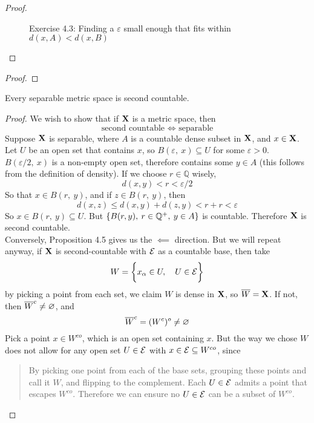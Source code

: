 \documentclass[../../main.tex]{subfiles}
\begin{document}
\begin{proof}
\begin{figure}
    \caption{Exercise 4.3: Finding a $\varepsilon$ small enough that fits within $d(x,A) < d(x,B)$}
    \label{fig:ex4.3}
\end{figure}
\end{proof}
\newpage

\begin{wts}
    
\end{wts}
\begin{proof}
    
\end{proof}
\newpage


\begin{wts}
    Every separable metric space is second countable.
\end{wts}
\begin{proof}
    We wish to show that if ${\mathbf{X}}$ is a metric space, then
    \[
        \text{second countable } \iff \text{ separable}
    \]
    Suppose ${\mathbf{X}}$ is separable, where $A$ is a countable dense subset in ${\mathbf{X}}$, and $x\in{\mathbf{X}}$. Let $U$ be an open set that contains $x$, so $B(\varepsilon,\: x)\subseteq U$ for some $\varepsilon>0$. $B(\varepsilon/2,\: x)$ is a non-empty open set, therefore contains some $y\in A$ (this follows from the definition of density). If we choose $r\in \mathbb{Q}$ wisely,
    \[
        d(x,y) < r < \varepsilon/2
    \]
    So that $x\in B(r,\: y)$, and if $z\in B(r,\: y)$, then 
    \[
        d(x,z)\leq d(x,y) + d(z,y)< r + r < \varepsilon
    \]
    So $x \in B(r,\: y)\subseteq U$. But $\{B(r,y),\: r\in\mathbb{Q}^+,\: y\in A\}$ is countable. Therefore ${\mathbf{X}}$ is second countable.\\
    
    Conversely, Proposition 4.5 gives us the $\impliedby$ direction. But we will repeat anyway, if ${\mathbf{X}}$ is second-countable with $\mathcal{E}$ as a countable base, then take 
    \[
        W = \biggl\{{x_\alpha\in U,\quad U\in \mathcal{E}}\biggr\}
    \]
    by picking a point from each set, we claim $W$ is dense in ${\mathbf{X}}$, so $\overline{W}={\mathbf{X}}$. If not, then $\overline{W}^c \neq\varnothing$, and 
    \[
        \overline{W}^c = (W^c)^o \neq \varnothing
    \]
    Pick a point $x \in W^{co}$, which is an open set containing $x$. But the way we chose $W$ does not allow for any open set $U\in \mathcal{E}$ with $x\in\mathcal{E} \subseteq W^{co}$, since
    \begin{quote}
        By picking one point from each of the base sets, grouping these points and call it $W$, and flipping to the complement. Each $U\in\mathcal{E}$ admits a point that escapes $W^{co}$. Therefore we can ensure  no $U\in\mathcal{E}$ can be a subset of $W^{co}$. 
    \end{quote}
\end{proof}
\newpage
\end{document}
